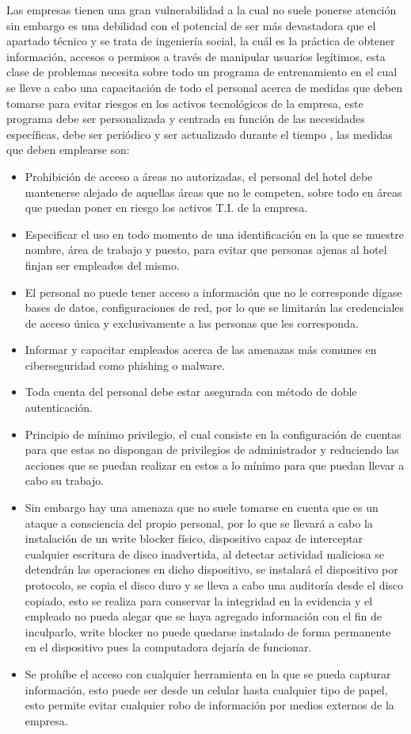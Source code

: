 \documentclass[10pt]{article}
\begin{document}
Las empresas tienen una gran vulnerabilidad a la cual no suele ponerse atención sin embargo es una debilidad con el potencial de ser más devastadora que el apartado técnico y se trata de ingeniería social, la cuál es la práctica de obtener información, accesos o permisos a través de manipular usuarios legítimos, esta clase de problemas necesita sobre todo un programa de entrenamiento en el cual se lleve a cabo una capacitación de todo el personal acerca de medidas que deben tomarse para evitar riesgos en los activos tecnológicos de la empresa, este programa debe ser personalizada y centrada en función de las necesidades específicas, debe ser periódico y ser actualizado durante el tiempo \cite{ref11}, las medidas que deben emplearse son:
\begin{itemize}
    \item Prohibición de acceso a áreas no autorizadas, el personal del hotel debe mantenerse alejado de aquellas áreas que no le competen, sobre todo en áreas que puedan poner en riesgo los activos T.I. de la empresa.
    \item Especificar el uso en todo momento de una identificación en la que se muestre nombre, área de trabajo y puesto, para evitar que personas ajenas al hotel finjan ser empleados del mismo.
    \item El personal no puede tener acceso a información que no le corresponde dígase bases de datos, configuraciones de red, por lo que se limitarán las credenciales de acceso única y exclusivamente a las personas que les corresponda.
    \item Informar y capacitar empleados acerca de las amenazas más comunes en ciberseguridad como phishing o malware.
    \item Toda cuenta del personal debe estar asegurada con método de doble autenticación.
    \item Principio de mínimo privilegio, el cual consiste en la configuración de cuentas para que estas no dispongan de privilegios de administrador y reduciendo las acciones que se puedan realizar en estos a lo mínimo para que puedan llevar a cabo su trabajo.
    \item Sin embargo hay una amenaza que no suele tomarse en cuenta que es un ataque a consciencia del propio personal, por lo que se llevará a cabo la instalación de un write blocker físico, dispositivo capaz de interceptar cualquier escritura de disco inadvertida, al detectar actividad maliciosa se detendrán las operaciones en dicho dispositivo, se instalará el dispositivo por protocolo, se copia el disco duro y se lleva a cabo una auditoría desde el disco copiado, esto se realiza para conservar la integridad en la evidencia y el empleado no pueda alegar que se haya agregado información con el fin de inculparlo, write blocker no puede quedarse instalado de forma permanente en el dispositivo pues la computadora dejaría de funcionar.
    \item Se prohíbe el acceso con cualquier herramienta en la que se pueda capturar información, esto puede ser desde un celular hasta cualquier tipo de papel, esto permite evitar cualquier robo de información por medios externos de la empresa.
    
\end{itemize}
\end{document}

